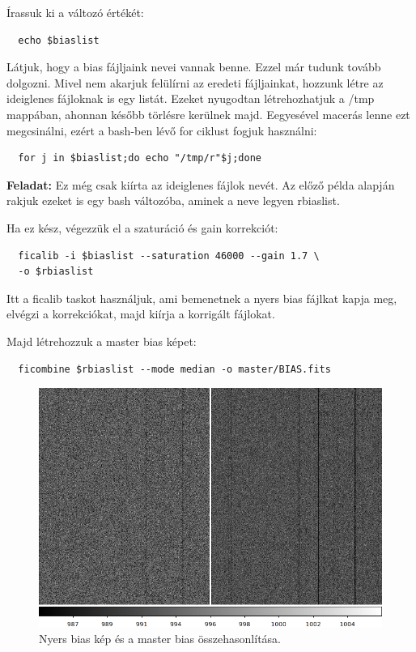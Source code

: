 \documentclass{article}
\begin{document}
Írassuk ki a változó értékét:
\begin{verbatim}
  echo $biaslist
\end{verbatim}

Látjuk, hogy a bias fájljaink nevei vannak benne. Ezzel már tudunk tovább
dolgozni.
Mivel nem akarjuk felülírni az eredeti fájljainkat, hozzunk létre az ideiglenes
fájloknak is egy listát. Ezeket nyugodtan létrehozhatjuk a /tmp mappában,
ahonnan később törlésre kerülnek majd.
Eegyesével macerás lenne ezt megcsinálni, ezért a bash-ben lévő for ciklust
fogjuk használni:

\begin{verbatim}
  for j in $biaslist;do echo "/tmp/r"$j;done
\end{verbatim}

{\bf Feladat:}
Ez még csak kiírta az ideiglenes fájlok nevét. Az előző példa alapján rakjuk
ezeket is egy bash változóba, aminek a neve legyen rbiaslist.

Ha ez kész, végezzük el a szaturáció és gain korrekciót:
\begin{verbatim}
  ficalib -i $biaslist --saturation 46000 --gain 1.7 \
  -o $rbiaslist
\end{verbatim}

Itt a ficalib taskot használjuk, ami bemenetnek a nyers bias fájlkat kapja meg,
elvégzi a korrekciókat, majd kiírja a korrigált fájlokat.

Majd létrehozzuk a master bias képet:
\begin{verbatim}
  ficombine $rbiaslist --mode median -o master/BIAS.fits
\end{verbatim}

\begin{figure}[ht!]
    \centering
    \includegraphics[width=0.8\linewidth]{pics/biascomp.png}
    \caption{Nyers bias kép és a master bias összehasonlítása.}
    \label{biascomp}
\end{figure}
\end{document}
